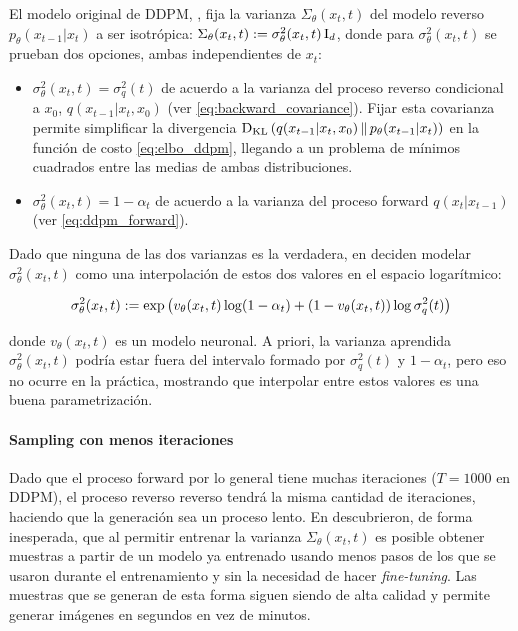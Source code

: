 El modelo original de DDPM, \cite{ho2020denoising}, fija la varianza $\Sigma_\theta(x_t,t)$ del modelo reverso $p_\theta(x_{t-1}|x_{t})$ a ser isotrópica: $\Sigma_\theta(x_t,t) := \sigma^2_\theta(x_t,t) \operatorname{I}_{d}$, donde para $\sigma^2_\theta(x_t,t)$ se prueban dos opciones, ambas independientes de $x_t$:

\begin{itemize}
    \item $\sigma^2_\theta(x_t,t) = \sigma_q^2(t)$ de acuerdo a la varianza del proceso reverso condicional a $x_0$, $q(x_{t-1}|x_t,x_0)$ (ver \eqref{eq:backward_covariance}). Fijar esta covarianza permite simplificar la divergencia $\operatorname{D_{KL}}\left(q(x_{t-1}|x_t,x_0)\,\|\,p_\theta(x_{t-1}|x_t)\right)$ en la función de costo \eqref{eq:elbo_ddpm}, llegando a un problema de mínimos cuadrados entre las medias de ambas distribuciones.
    \item $\sigma^2_\theta(x_t,t) = 1-\alpha_t$ de acuerdo a la varianza del proceso forward $q(x_t|x_{t-1})$ (ver \eqref{eq:ddpm_forward}).
\end{itemize}

Dado que ninguna de las dos varianzas es la verdadera, en \cite{nichol2021improved} deciden modelar $\sigma^2_\theta(x_t,t)$ como una interpolación de estos dos valores en el espacio logarítmico:

\begin{equation}
    \label{eq:improved_variance}
    \sigma^2_\theta(x_t,t):= \exp\left(v_\theta(x_t,t)\log (1-\alpha_t) + (1-v_\theta(x_t,t))\log \sigma^2_q(t)\right)
\end{equation}

donde $v_\theta(x_t,t)$ es un modelo neuronal. A priori, la varianza aprendida $\sigma^2_\theta(x_t,t)$ podría estar fuera del intervalo formado por $\sigma_q^2(t)$ y $1-\alpha_t$, pero eso no ocurre en la práctica, mostrando que interpolar entre estos valores es una buena parametrización.

\paragraph{Sampling con menos iteraciones}

Dado que el proceso forward por lo general tiene muchas iteraciones ($T=1000$ en DDPM), el proceso reverso reverso tendrá la misma cantidad de iteraciones, haciendo que la generación sea un proceso lento. En \cite{nichol2021improved} descubrieron, de forma inesperada, que al permitir entrenar la varianza $\Sigma_\theta(x_t,t)$ es posible obtener muestras a partir de un modelo ya entrenado usando menos pasos de los que se usaron durante el entrenamiento y sin la necesidad de hacer \textit{fine-tuning}. Las muestras que se generan de esta forma siguen siendo de alta calidad y permite generar imágenes en segundos en vez de minutos.

